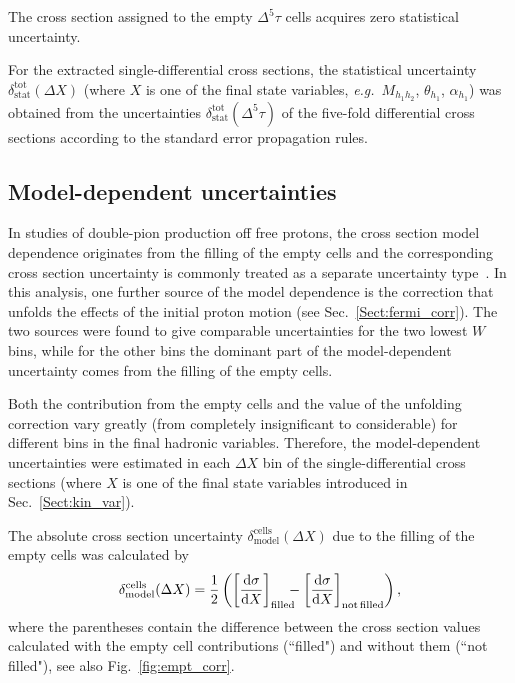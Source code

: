 \documentclass[prc,twocolumn,superscriptaddress,showpacs,amssymb,amsmath,amsfonts,aps,nofootinbib]{revtex4-1}
\begin{document}
The cross section assigned to the empty $\Delta^{5} \tau$ cells acquires zero statistical uncertainty.


For the extracted  single-differential cross sections, the statistical uncertainty $\delta_{\text{stat}}^{\text{tot}}(\Delta X)$ (where $X$ is one of the final state variables, {\it e.g.}~$M_{h_{1}h_{2}}$, $\theta_{h_1}$, $\alpha_{h_1}$) was obtained from the uncertainties  $\delta_{\text{stat}}^{\text{tot}}(\Delta^{5} \tau)$ of the five-fold differential cross sections according to the standard error propagation rules.



\subsection{Model-dependent uncertainties}
\label{Sect:mod_dep}


In studies of double-pion production off free protons, the cross section model dependence originates from the filling of the empty cells and the corresponding cross section uncertainty is commonly treated as a separate uncertainty type~\cite{Rip_an_note:2002,Ripani:2002ss,Fed_an_note:2007,Fedotov:2008aa,Isupov:2017lnd,Arjun,Fed_an_note:2017,Fed_paper_2018}. In this analysis, one further source of the model dependence is the correction that unfolds the effects of the initial proton motion (see Sec.\!~\ref{Sect:fermi_corr}). The two sources were found to give comparable uncertainties for the two lowest $W$ bins, while for the other bins the dominant part of the model-dependent uncertainty comes from the filling of the empty cells.

Both the contribution from the empty cells and the value of the unfolding correction vary greatly (from completely insignificant to considerable) for different bins in the final hadronic variables. Therefore, the model-dependent uncertainties were estimated in each $\Delta X$ bin of the single-differential cross sections (where $X$ is one of the final state variables introduced in Sec.\!~\ref{Sect:kin_var}).


The absolute cross section uncertainty $\delta^{\text{cells}}_{\text{model}}(\Delta X)$ due to the filling of the empty cells was calculated by
\begin{equation}
\delta^{\text{cells}}_{\text{model}} (\Delta X) = \frac{1}{2}\left ( \left [ \frac{\textrm{d}\sigma}{\textrm{d}X} \right ]_{\text{filled}}\!\!\!\! - \left [\frac{\textrm{d}\sigma}{\textrm{d}X} \right ]_{\text{not~\!filled}}\!~\!\right ),
\label{eq:error_mod_abs}
\end{equation}
where the parentheses contain the difference between the cross section values calculated with the empty cell contributions (``filled") and without them (``not filled"), see also Fig.\!~\ref{fig:empt_corr}.
\end{document}
